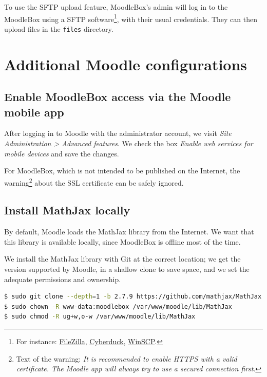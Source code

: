 \documentclass[12pt]{article}
\begin{document}
To use the SFTP upload feature, MoodleBox's admin will log in to the MoodleBox using a SFTP software\footnote{For instance: \href{https://filezilla-project.org/}{FileZilla}, \href{https://cyberduck.io/}{Cyberduck}, \href{http://winscp.net/}{WinSCP}.}, with their usual credentials.
They can then upload files in the \lstinline{files} directory.

\section{Additional Moodle configurations}

\subsection{Enable MoodleBox access via the Moodle mobile app}

After logging in to Moodle with the administrator account, we visit \textsl{Site Administration > Advanced features}.
We check the box \emph{Enable web services for mobile devices} and save the changes.

For MoodleBox, which is not intended to be published on the Internet, the warning\footnote{Text of the warning: \textsl{It is recommended to enable HTTPS with a valid certificate. The Moodle app will always try to use a secured connection first}.} about the SSL certificate can be safely ignored.

\subsection{Install MathJax locally}

By default, Moodle loads the MathJax library from the Internet.
We want that this library is available locally, since MoodleBox is offline most of the time.

We install the MathJax library with Git at the correct location; we get the version supported by Moodle, in a shallow clone to save space, and we set the adequate permissions and ownership.
\begin{lstlisting}[language=bash]
$ sudo git clone --depth=1 -b 2.7.9 https://github.com/mathjax/MathJax.git /var/www/moodle/lib/MathJax
$ sudo chown -R www-data:moodlebox /var/www/moodle/lib/MathJax
$ sudo chmod -R ug+w,o-w /var/www/moodle/lib/MathJax
\end{lstlisting}
\end{document}
